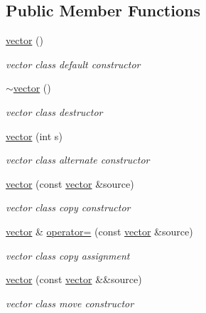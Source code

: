 \subsection*{Public Member Functions}
\begin{DoxyCompactItemize}
\item 
\mbox{\hyperlink{classproject_1_1vector_ae194dee52fe56d5fe6625021aad2d63d}{vector}} ()
\begin{DoxyCompactList}\small\item\em vector class default constructor \end{DoxyCompactList}\item 
\mbox{\hyperlink{classproject_1_1vector_a7abf9e5bf13e90184fe454e468e282d4}{$\sim$vector}} ()
\begin{DoxyCompactList}\small\item\em vector class destructor \end{DoxyCompactList}\item 
\mbox{\hyperlink{classproject_1_1vector_ad065d3806d059712feea6fb639b35f87}{vector}} (int s)
\begin{DoxyCompactList}\small\item\em vector class alternate constructor \end{DoxyCompactList}\item 
\mbox{\hyperlink{classproject_1_1vector_af93a6afbfc6eeefb9b712660685e17cf}{vector}} (const \mbox{\hyperlink{classproject_1_1vector}{vector}} \&source)
\begin{DoxyCompactList}\small\item\em vector class copy constructor \end{DoxyCompactList}\item 
\mbox{\hyperlink{classproject_1_1vector}{vector}} \& \mbox{\hyperlink{classproject_1_1vector_a0c815ad332028cd9c33ea6a441c6b54f}{operator=}} (const \mbox{\hyperlink{classproject_1_1vector}{vector}} \&source)
\begin{DoxyCompactList}\small\item\em vector class copy assignment \end{DoxyCompactList}\item 
\mbox{\hyperlink{classproject_1_1vector_acdd6c35b3513c3be41b5afcfc9470866}{vector}} (const \mbox{\hyperlink{classproject_1_1vector}{vector}} \&\&source)
\begin{DoxyCompactList}\small\item\em vector class move constructor \end{DoxyCompactList}\item 

\end{DoxyCompactItemize}
